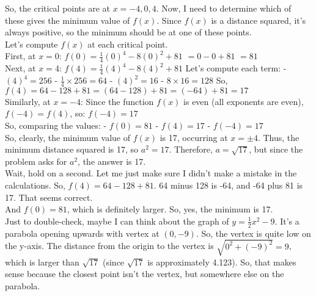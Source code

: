 \begin{abox}
So, the critical points are at $ x = -4, 0, 4 $. Now, I need to determine which of these gives the minimum value of $ f(x) $. Since $ f(x) $ is a distance squared, it's always positive, so the minimum should be at one of these points.\\

Let's compute $ f(x) $ at each critical point.\\
First, at $ x = 0 $:
$ f(0) = \frac{1}{4}(0)^4 - 8(0)^2 + 81 $
$ = 0 - 0 + 81 $
$ = 81 $\\

Next, at $ x = 4 $:
$ f(4) = \frac{1}{4}(4)^4 - 8(4)^2 + 81 $
Let's compute each term:
- $ (4)^4 = 256 $
- $ \frac{1}{4} \times 256 = 64 $
- $ (4)^2 = 16 $
- $ 8 \times 16 = 128 $
So,
$ f(4) = 64 - 128 + 81 = (64 - 128) + 81 = (-64) + 81 = 17 $\\

Similarly, at $ x = -4 $:
Since the function $ f(x) $ is even (all exponents are even), $ f(-4) = f(4) $, so:
$ f(-4) = 17 $\\

So, comparing the values:
- $ f(0) = 81 $
- $ f(4) = 17 $
- $ f(-4) = 17 $\\

So, clearly, the minimum value of $ f(x) $ is 17, occurring at $ x = \pm 4 $. Thus, the minimum distance squared is 17, so $ a^2 = 17 $. Therefore, $ a = \sqrt{17} $, but since the problem asks for $ a^2 $, the answer is 17.\\

Wait, hold on a second. Let me just make sure I didn't make a mistake in the calculations. So, $ f(4) = 64 - 128 + 81 $. 64 minus 128 is -64, and -64 plus 81 is 17. That seems correct.\\

And $ f(0) = 81 $, which is definitely larger. So, yes, the minimum is 17.\\

Just to double-check, maybe I can think about the graph of $ y = \frac{1}{2}x^2 - 9 $. It's a parabola opening upwards with vertex at $ (0, -9) $. So, the vertex is quite low on the y-axis. The distance from the origin to the vertex is $ \sqrt{0^2 + (-9)^2} = 9 $, which is larger than $ \sqrt{17} $ (since $ \sqrt{17} $ is approximately 4.123). So, that makes sense because the closest point isn't the vertex, but somewhere else on the parabola.
\end{abox}
